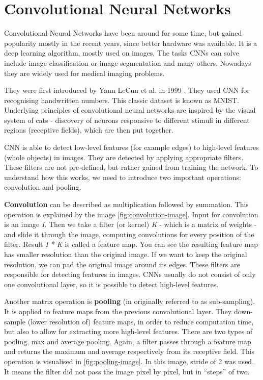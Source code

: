 \chapter{Convolutional Neural Networks}
\label{ch:cnn}
Convolutional Neural Networks have been around for some time, but gained popularity mostly in the recent years, since better hardware was available. It is a deep learning algorithm, mostly used on images. The tasks CNNs can solve include image classification or image segmentation and many others. Nowadays they are widely used for medical imaging problems. 

They were first introduced by Yann LeCun et al. in 1999 \cite{lecun1999}. They used CNN for recognising handwritten numbers. This classic dataset is known as MNIST. Underlying principles of convolutional neural networks are inspired by the visual system of cats - discovery of neurons responsive to different stimuli in different regions (receptive fields), which are then put together.

CNN is able to detect low-level features (for example edges) to high-level features (whole objects) in images. They are detected by applying appropriate filters. These filters are not pre-defined, but rather gained from training the network. To understand how this works, we need to introduce two important operations: convolution and pooling.

\textbf{Convolution} can be described as multiplication followed by summation. This operation is explained by the image \ref{fig:convolution-image}. Input for convolution is an image \textit{I}. Then we take a filter (or kernel) \textit{K} - which is a matrix of weights - and slide it through the image, computing convolutions for every position of the filter. Result \textit{I * K} is called a feature map. You can see the resulting feature map has smaller resolution than the original image. If we want to keep the original resolution, we can pad the original image around its edges. These filters are responsible for detecting features in images. CNNs usually do not consist of only one convolutional layer, so it is possible to detect high-level features. 

Another matrix operation is \textbf{pooling} (in \cite{lecun1999} originally referred to as sub-sampling). It is applied to feature maps from the previous convolutional layer. They down-sample (lower resolution of) feature maps, in order to reduce computation time, but also to allow for extracting more high-level features. There are two types of pooling, max and average pooling. Again, a filter passes through a feature map and returns the maximum and average respectively from its receptive field. This operation is visualised in \ref{fig:pooling-image}. In this image, stride of 2 was used. It means the filter did not pass the image pixel by pixel, but in ``steps'' of two.

